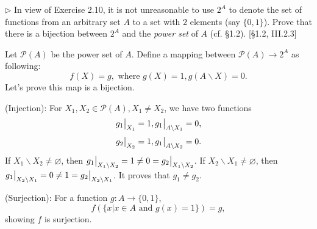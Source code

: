\begin{problem}[2.11]
  $\rhd$ In view of Exercise 2.10, it is not unreasonable to use $2^A$ to denote
  the set of functions from an arbitrary set $A$ to a set with $2$ elements (say
  $\{0,1\}$). Prove that there is a bijection between $2^A$ and the \textit{power
    set} of $A$ (cf. \S1.2). [\S1.2, III.2.3]
\end{problem}

\begin{solution}
Let $\mathcal{P}(A)$ be the power set of $A$. Define a mapping between $\mathcal{P}(A)\to 2^A$ as following:
$$f(X) = g, \text{ where } g(X) = 1, g(A\backslash X) = 0.$$ Let's prove this map is a bijection.

(Injection): For $X_1, X_2\in \mathcal{P}(A), X_1\neq X_2$, we have two functions 
$$g_1\big{|}_{X_1} = 1, g_1\big{|}_{A\backslash X_1} = 0,$$
$$g_2\big{|}_{X_2} = 1, g_1\big{|}_{A\backslash X_2} = 0.$$
If $X_1\backslash X_2\neq \varnothing$, then $g_1\big{|}_{X_1\backslash X_2} = 1\neq 0 = g_2\big{|}_{X_1\backslash X_2}$.
If $X_2\backslash X_1\neq \varnothing$, then $g_1\big{|}_{X_2\backslash X_1} = 0\neq 1 = g_2\big{|}_{X_2\backslash X_1}$. 
It proves that $g_1 \neq g_2$.

(Surjection): For a function $g: A\to \{0,1\}$, $$f(\{x| x\in A \text{ and } g(x)= 1\}) = g,$$
showing $f$ is surjection.
\end{solution}







